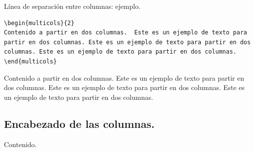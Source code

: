 \documentclass[dvipsnames,xcolor, handout]{beamer}
\theoremstyle{plain}
\theoremstyle{definition}
\begin{document}
{
\setlength{\columnseprule}{1mm}
\begin{frame}[fragile]{Línea de separación entre columnas: ejemplo.}
\begin{footnotesize}
\begin{verbatim}
\begin{multicols}{2}
Contenido a partir en dos columnas.  Este es un ejemplo de texto para
partir en dos columnas. Este es un ejemplo de texto para partir en dos
columnas. Este es un ejemplo de texto para partir en dos columnas. 
\end{multicols}
\end{verbatim}
\end{footnotesize}
\vfill\pause
\begin{footnotesize}
    \begin{multicols}{2}
    Contenido a partir en dos columnas.  Este es un ejemplo de texto para
partir en dos columnas. Este es un ejemplo de texto para partir en dos
columnas. Este es un ejemplo de texto para partir en dos columnas. 
    \end{multicols}
\end{footnotesize}
\end{frame}
}

\subsection{Encabezado de las columnas.}

\begin{frame}{Contenido.}
 \begin{footnotesize}
\vspace*{-1cm}
\begin{multicols}{2}
  \tableofcontents[currentsubsection]
\end{multicols}
\end{footnotesize}
\end{frame}
\end{document}

